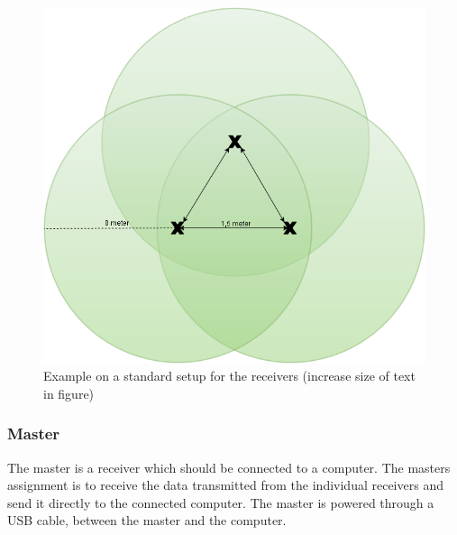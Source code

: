 \begin{figure}[H]
	\centering
	\includegraphics[scale=0.5]{figures/ReceiverSetup.png}
	\caption{Example on a standard setup for the receivers (increase size of text in figure)}
	\label{receiverSetup}
	\flushleft
\end{figure}

\subsubsection{Master}
The master is a receiver which should be connected to a computer. The masters assignment is to receive the data transmitted from the individual receivers and send it directly to the connected computer. The master is powered through a USB cable, between the master and the computer.
